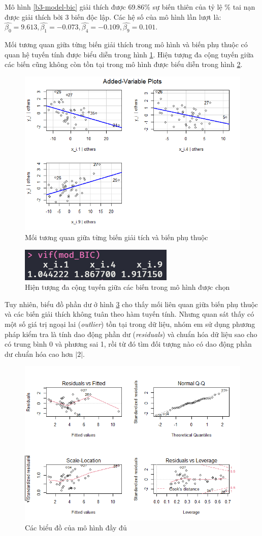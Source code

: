 Mô hình \ref{b3-model-bic} giải thích được 69.86\% sự biến thiên của tỷ lệ \% tai nạn được giải thích bởi 3 biến độc lập. Các hệ số của mô hình lần lượt là: $\hat{\beta_0}=9.613, \hat{\beta_1}=-0.073, \hat{\beta_4}=-0.109, \hat{\beta_9}=0.101$.

Mối tương quan giữa từng biến giải thích trong mô hình và biến phụ thuộc có quan hệ tuyến tính được biểu diễn trong hình \ref{fig-b3:model-bic-vars}. Hiện tượng đa cộng tuyến giữa các biến cũng không còn tồn tại trong mô hình được biểu diễn trong hình \ref{fig-b3:model-bic-vif}.
\begin{figure}[H]
	\centering
	\includegraphics[width=0.65\linewidth]{images/B3/model-bic-vars}
	\caption{Mối tương quan giữa từng biến giải tích và biến phụ thuộc}
	\label{fig-b3:model-bic-vars}
\end{figure}

\begin{figure}[H]
	\centering
	\includegraphics[width=0.35\linewidth]{images/B3/model-bic-vif}
	\caption{Hiện tượng đa cộng tuyến giữa các biến trong mô hình được chọn}
	\label{fig-b3:model-bic-vif}
\end{figure}


Tuy nhiên, biểu đồ phần dư ở hình \ref{fig-b3:model-full-plot} cho thấy mối liên quan giữa biến phụ thuộc và các biến giải thích không tuân theo hàm tuyến tính. Nhưng quan sát thấy có một số giá trị ngoại lai (\textit{outlier}) tồn tại trong dữ liệu, nhóm em sử dụng phương pháp kiểm tra là tính dao động phần dư (\textit{residuals}) và chuẩn hóa dữ liệu sao cho có trung bình 0 và phương sai 1, rồi từ đó tìm đối tượng nào có dao động phần dư chuẩn hóa cao hơn $|2|$. 
\begin{figure}[H]
	\centering
	\includegraphics[width=0.65\linewidth]{images/B3/model-full-plot}
	\caption{Các biểu đồ của mô hình đầy đủ}
	\label{fig-b3:model-full-plot}
\end{figure}

